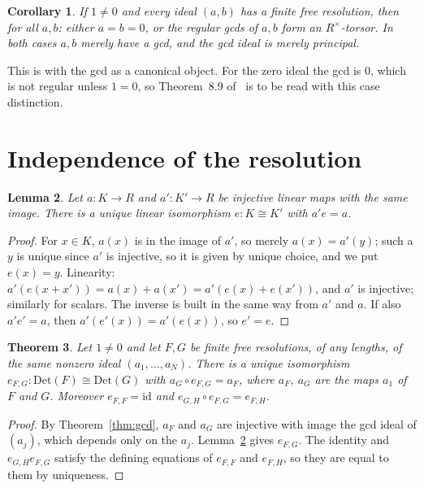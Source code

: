 \documentclass[11pt]{amsart}
\newtheorem{theorem}{Theorem}
\newtheorem{lemma}[theorem]{Lemma}
\newtheorem{corollary}[theorem]{Corollary}
\theoremstyle{definition}
\theoremstyle{remark}
\newcommand{\Det}{\mathrm{Det}}
\begin{document}
\begin{corollary}
If $1\neq0$ and every ideal $(a,b)$ has a finite free resolution, then for
all $a,b$: either $a=b=0$, or the regular gcds of $a,b$ form an
$R^\times$-torsor.  In both cases $a,b$ merely have a gcd, and the gcd
ideal is merely principal.
\end{corollary}

This is \cite[Corollary~8.10]{CQ} with the gcd as a canonical object.  For
the zero ideal the gcd is $0$, which is not regular unless $1=0$, so
Theorem~8.9 of~\cite{CQ} is to be read with this case distinction.

\section{Independence of the resolution}

\begin{lemma}\label{lem:compare}
Let $a:K\to R$ and $a':K'\to R$ be injective linear maps with the same
image.  There is a unique linear isomorphism $e:K\cong K'$ with $a'e=a$.
\end{lemma}

\begin{proof}
For $x\in K$, $a(x)$ is in the image of $a'$, so merely $a(x)=a'(y)$;
such a $y$ is unique since $a'$ is injective, so it is given by unique
choice, and we put $e(x)=y$.  Linearity: $a'(e(x+x'))=a(x)+a(x')=
a'(e(x)+e(x'))$, and $a'$ is injective; similarly for scalars.  The
inverse is built in the same way from $a'$ and $a$.  If also $a'e'=a$,
then $a'(e'(x))=a'(e(x))$, so $e'=e$.
\end{proof}

\begin{theorem}\label{thm:compare}
Let $1\neq0$ and let $F,G$ be finite free resolutions, of any lengths, of
the same nonzero ideal $(a_1,\dots,a_N)$.  There is a unique isomorphism
$e_{F,G}:\Det(F)\cong\Det(G)$ with $a_G\circ e_{F,G}=a_F$, where $a_F$,
$a_G$ are the maps $a_1$ of $F$ and $G$.  Moreover $e_{F,F}=\mathrm{id}$
and $e_{G,H}\circ e_{F,G}=e_{F,H}$.
\end{theorem}

\begin{proof}
By Theorem~\ref{thm:gcd}, $a_F$ and $a_G$ are injective with image the gcd
ideal of $(a_j)$, which depends only on the $a_j$.  Lemma~\ref{lem:compare}
gives $e_{F,G}$.  The identity and $e_{G,H}e_{F,G}$ satisfy the defining
equations of $e_{F,F}$ and $e_{F,H}$, so they are equal to them by
uniqueness.
\end{proof}
\end{document}
